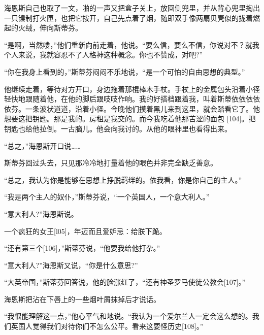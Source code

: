 \documentclass{article}
\begin{document}
海恩斯自己也取了一文，啪的一声又把盒子关上，放回侧兜里，并从背心兜里掏出一只镍制打火匣，也把它按开，自己先点着了烟，随即双手像两扇贝壳似的拢着燃起的火绒，伸向斯蒂芬。



“是啊，当然喽，”他们重新向前走着，他说。“要么信，要么不信，你说对不？就我个人来说，我就容忍不了人格神这种概念。你也不赞成，对吧?”



“你在我身上看到的，”斯蒂芬闷闷不乐地说，“是一个可怕的自由思想的典型。”



他继续走着，等待对方开口，身边拖着那棍棒木手杖。手杖上的金属包头沿着小径轻快地跟随着他，在他的脚后跟吱吱作响。我的好搭档跟着我，叫着斯蒂依依依依依芬。一条波状道道，沿着小径。今晚他们摸着黑儿来到这里，就会踏看它了。他想要这把钥匙。那是我的。房租是我交的。而今我吃着他那苦涩的面包 [104]。把钥匙也给他拉倒。一古脑儿。他会向我讨的。从他的眼神里也看得出来。



“总之，”海恩斯开口说……



斯蒂芬回过头去，只见那冷冷地打量着他的眼色并非完全缺乏善意。



“总之，我认为你是能够在思想上挣脱羁绊的。依我看，你是你自己的主人。”



“我是两个主人的奴仆，”斯蒂芬说，“一个英国人，一个意大利人。”



“意大利人?”海恩斯说。



一个疯狂的女王[l05]，年迈而且爱妒忌：给朕下跪。



“还有第三个[106]，”斯蒂芬说，“他要我给他打杂。”



“意大利人?”海恩斯又说，“你是什么意思?”



“大英帝国，”斯蒂芬回答说，他的脸涨红了，“还有神圣罗马使徒公教会[107]。”



海恩斯把沾在下唇上的一些烟叶屑抹掉后才说话。



“我很能理解这一点，”他心平气和地说。“我认为一个爱尔兰人一定会这么想的。我们英国人觉得我们对待你们不怎么公平。看来这要怪历史[108]。”
\end{document}
